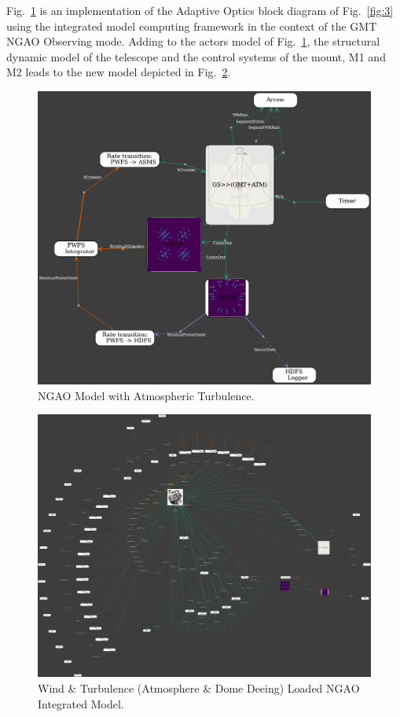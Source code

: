 \documentclass[]{AO4ELT}  %
\begin{document}
Fig.~\ref{fig:16a} is an implementation of the Adaptive Optics block diagram of Fig.~\ref{fig:3} using the integrated model computing framework in the context of the GMT NGAO Observing mode.
Adding to the actors model of Fig.~\ref{fig:16a}, the structural dynamic model of the telescope and the control systems of the mount, M1 and M2 leads
to the new model depicted in Fig.~\ref{fig:16b}.


\begin{figure}
   \centering
   \includegraphics[width=0.8\linewidth]{NGAO.dot.png}
   \caption{NGAO Model with Atmospheric Turbulence.}
   \label{fig:16a}
\end{figure}

\begin{figure}
   \centering
   \includegraphics[width=\linewidth]{ngao-opm.2pi.png}
   \caption{Wind \& Turbulence (Atmosphere \& Dome Deeing) Loaded NGAO Integrated Model.}
   \label{fig:16b}
\end{figure}
\end{document}
